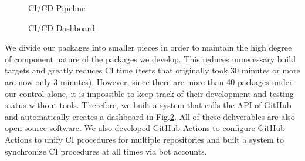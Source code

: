 \documentclass[lettersize,journal]{IEEEtran}
\begin{document}
\begin{figure}[t]
    \begin{center}
  \end{center}
  \caption{CI/CD Pipeline}
  \label{fig:ci_cd_pipeline}
\end{figure}

\begin{figure}[t]
    \begin{center}
  \end{center}
  \caption{CI/CD Dashboard}
  \label{fig:ci_cd_dashboard}
\end{figure}

We divide our packages into smaller pieces in order to maintain the high degree of component nature of the packages we develop.
This reduces unnecessary build targets and greatly reduces CI time (tests that originally took 30 minutes or more are now only 3 minutes).
However, since there are more than 40 packages under our control alone,
it is impossible to keep track of their development and testing status without tools.
Therefore, we built a system that calls the API of GitHub and automatically creates a dashboard in Fig.\ref{fig:ci_cd_dashboard}.
All of these deliverables are also open-source software.
We also developed GitHub Actions to configure GitHub Actions to unify CI procedures for multiple repositories and
built a system to synchronize CI procedures at all times via bot accounts. \cite{wam-v-tan_bot}
\end{document}
